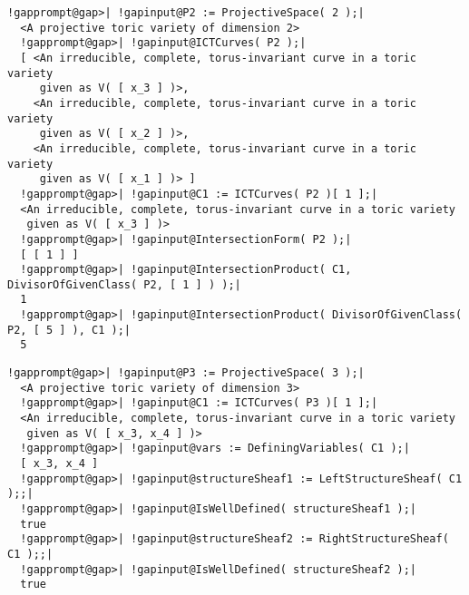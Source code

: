 \documentclass[a4paper,11pt]{report}
\begin{document}
{{\begin{Verbatim}[commandchars=!@|,fontsize=\small,frame=single,label=Example]
  !gapprompt@gap>| !gapinput@P2 := ProjectiveSpace( 2 );|
  <A projective toric variety of dimension 2>
  !gapprompt@gap>| !gapinput@ICTCurves( P2 );|
  [ <An irreducible, complete, torus-invariant curve in a toric variety
     given as V( [ x_3 ] )>,
    <An irreducible, complete, torus-invariant curve in a toric variety
     given as V( [ x_2 ] )>,
    <An irreducible, complete, torus-invariant curve in a toric variety
     given as V( [ x_1 ] )> ]
  !gapprompt@gap>| !gapinput@C1 := ICTCurves( P2 )[ 1 ];|
  <An irreducible, complete, torus-invariant curve in a toric variety
   given as V( [ x_3 ] )>
  !gapprompt@gap>| !gapinput@IntersectionForm( P2 );|
  [ [ 1 ] ]
  !gapprompt@gap>| !gapinput@IntersectionProduct( C1, DivisorOfGivenClass( P2, [ 1 ] ) );|
  1
  !gapprompt@gap>| !gapinput@IntersectionProduct( DivisorOfGivenClass( P2, [ 5 ] ), C1 );|
  5
\end{Verbatim}
 
\begin{Verbatim}[commandchars=!@|,fontsize=\small,frame=single,label=Example]
  !gapprompt@gap>| !gapinput@P3 := ProjectiveSpace( 3 );|
  <A projective toric variety of dimension 3>
  !gapprompt@gap>| !gapinput@C1 := ICTCurves( P3 )[ 1 ];|
  <An irreducible, complete, torus-invariant curve in a toric variety
   given as V( [ x_3, x_4 ] )>
  !gapprompt@gap>| !gapinput@vars := DefiningVariables( C1 );|
  [ x_3, x_4 ]
  !gapprompt@gap>| !gapinput@structureSheaf1 := LeftStructureSheaf( C1 );;|
  !gapprompt@gap>| !gapinput@IsWellDefined( structureSheaf1 );|
  true
  !gapprompt@gap>| !gapinput@structureSheaf2 := RightStructureSheaf( C1 );;|
  !gapprompt@gap>| !gapinput@IsWellDefined( structureSheaf2 );|
  true
\end{Verbatim}
 }

 }

   
\end{document}
